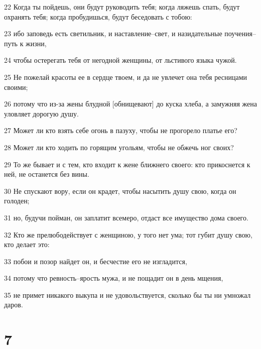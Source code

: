 \par 22 Когда ты пойдешь, они будут руководить тебя; когда ляжешь спать, будут охранять тебя; когда пробудишься, будут беседовать с тобою:
\par 23 ибо заповедь есть светильник, и наставление--свет, и назидательные поучения--путь к жизни,
\par 24 чтобы остерегать тебя от негодной женщины, от льстивого языка чужой.
\par 25 Не пожелай красоты ее в сердце твоем, и да не увлечет она тебя ресницами своими;
\par 26 потому что из-за жены блудной [обнищевают] до куска хлеба, а замужняя жена уловляет дорогую душу.
\par 27 Может ли кто взять себе огонь в пазуху, чтобы не прогорело платье его?
\par 28 Может ли кто ходить по горящим угольям, чтобы не обжечь ног своих?
\par 29 То же бывает и с тем, кто входит к жене ближнего своего: кто прикоснется к ней, не останется без вины.
\par 30 Не спускают вору, если он крадет, чтобы насытить душу свою, когда он голоден;
\par 31 но, будучи пойман, он заплатит всемеро, отдаст все имущество дома своего.
\par 32 Кто же прелюбодействует с женщиною, у того нет ума; тот губит душу свою, кто делает это:
\par 33 побои и позор найдет он, и бесчестие его не изгладится,
\par 34 потому что ревность--ярость мужа, и не пощадит он в день мщения,
\par 35 не примет никакого выкупа и не удовольствуется, сколько бы ты ни умножал даров.

\chapter{7}

